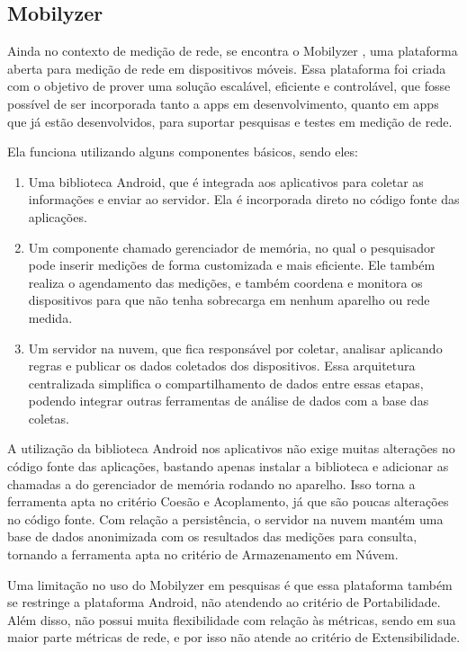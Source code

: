 \documentclass[12pt]{tcc}
\begin{document}
		\subsection{Mobilyzer}
		\par Ainda no contexto de medição de rede, se encontra o Mobilyzer \citep{Nikravesh2015Mobilyzer}, uma plataforma aberta para medição de rede em dispositivos móveis. Essa plataforma foi criada com o objetivo de prover uma solução escalável, eficiente e controlável, que fosse possível de ser incorporada tanto a apps em desenvolvimento, quanto em apps que já estão desenvolvidos, para suportar pesquisas e testes em medição de rede. 
		\par Ela funciona utilizando alguns componentes básicos, sendo eles: 
		\begin{enumerate}
			\item Uma biblioteca Android, que é integrada aos aplicativos para coletar as informações e enviar ao servidor. Ela é incorporada direto no código fonte das aplicações.
			\item Um componente chamado gerenciador de memória, no qual o pesquisador pode inserir medições de forma customizada e mais eficiente. Ele também realiza o agendamento das medições, e também coordena e monitora os dispositivos para que não tenha sobrecarga em nenhum aparelho ou rede medida. 
			\item Um servidor na nuvem, que fica responsável por coletar, analisar aplicando regras e publicar os dados coletados dos dispositivos. Essa arquitetura centralizada simplifica o compartilhamento de dados entre essas etapas, podendo integrar outras ferramentas de análise de dados com a base das coletas.

		\end{enumerate}
		
		A utilização da biblioteca Android nos aplicativos não exige muitas alterações no código fonte das aplicações, bastando apenas instalar a biblioteca e adicionar as chamadas a  do gerenciador de memória rodando no aparelho. Isso torna a ferramenta apta no critério Coesão e Acoplamento, já que são poucas alterações no código fonte. Com relação a persistência, o servidor na nuvem mantém uma base de dados anonimizada com os resultados das medições para consulta, tornando a ferramenta apta no critério de Armazenamento em Núvem.

		Uma limitação no uso do Mobilyzer em pesquisas é que essa plataforma também se restringe a plataforma Android, não atendendo ao critério de Portabilidade. Além disso, não possui muita flexibilidade com relação às métricas, sendo em sua maior parte métricas de rede, e por isso não atende ao critério de Extensibilidade.
	
\end{document}
